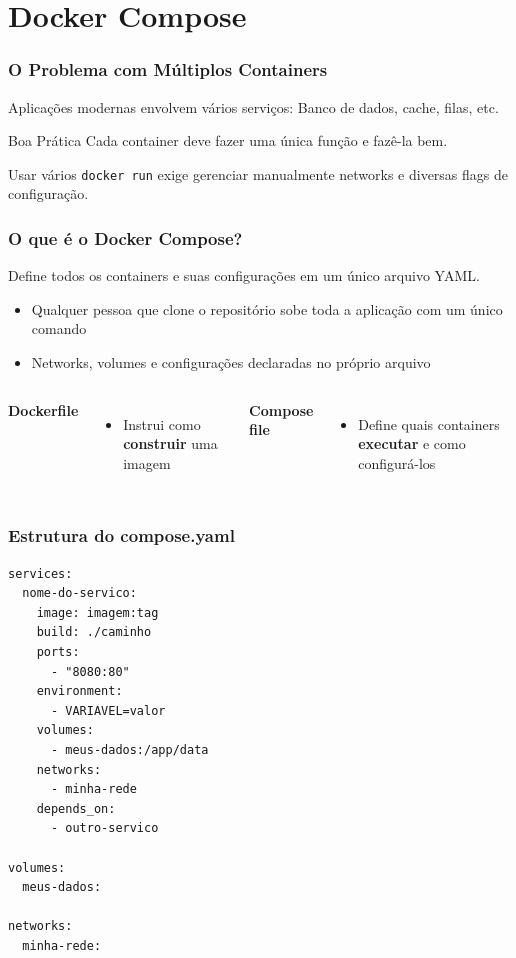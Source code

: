 \section{Docker Compose}

\begin{frame}
  \frametitle{O Problema com Múltiplos Containers}
  Aplicações modernas envolvem vários serviços: Banco de dados, cache, filas, etc.

  \vspace{0.5em}
  \begin{block}{Boa Prática}
    Cada container deve fazer uma única função e fazê-la bem.
  \end{block}

  \vspace{0.5em}
  Usar vários \texttt{docker run} exige gerenciar manualmente networks
  e diversas flags de configuração.
\end{frame}

\begin{frame}
  \frametitle{O que é o Docker Compose?}
  Define todos os containers e suas configurações em um único arquivo YAML.

  \vspace{0.5em}
  \begin{itemize}
    \item Qualquer pessoa que clone o repositório sobe toda a aplicação com um único comando
    \item Networks, volumes e configurações declaradas no próprio arquivo
  \end{itemize}

  \vspace{0.5em}
  \begin{columns}
      \textbf{Dockerfile}
      \begin{itemize}
        \item Instrui como \textbf{construir} uma imagem
      \end{itemize}

      \textbf{Compose file}
      \begin{itemize}
        \item Define quais containers \textbf{executar} e como configurá-los
      \end{itemize}
  \end{columns}
\end{frame}

\begin{frame}[fragile]
  \frametitle{Estrutura do compose.yaml}
  \small
\begin{verbatim}
services:
  nome-do-servico:
    image: imagem:tag
    build: ./caminho
    ports:
      - "8080:80"
    environment:
      - VARIAVEL=valor
    volumes:
      - meus-dados:/app/data
    networks:
      - minha-rede
    depends_on:
      - outro-servico

volumes:
  meus-dados:

networks:
  minha-rede:
\end{verbatim}
\end{frame}

